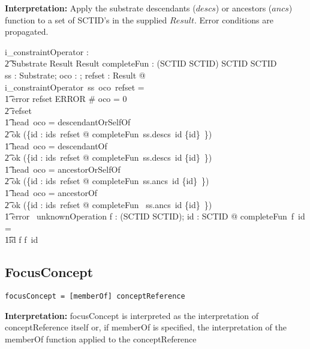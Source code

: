 \documentclass{article}
\begin{document}
\noindent
\textbf{Interpretation:}  Apply the substrate descendants ($descs$) or ancestors ($ancs$) function to a set of SCTID's in the supplied
$Result$.  Error conditions are propagated.


\begin{gendef}
   i\_constraintOperator : \\
\t2 Substrate \pfun \optional[constraintOperator] \pfun Result \pfun Result
\also
   completeFun : (SCTID \pfun \power SCTID) \fun SCTID \fun \power SCTID \\
\where
	\forall ss : Substrate; oco : \optional[constraintOperator]; refset : Result @ \\
i\_constraintOperator~ss~oco~refset = \\
\t1 \IF error \inv refset \in ERROR \lor \# oco = 0 \\
\t2 \THEN refset \\
\t1 \ELSE \IF head~oco = descendantOrSelfOf~ \\
\t2 \THEN ok (\bigcup \{id : ids~refset @ completeFun~ss.descs~id \cup \{id\}~\}) \\
\t1 \ELSE \IF head~oco = descendantOf~ \\
\t2 \THEN ok  (\bigcup \{id : ids~refset @ completeFun~ss.descs~id \setminus \{id\}~\}) \\
\t1 \ELSE \IF head~oco = ancestorOrSelfOf~ \\
\t2 \THEN  ok (\bigcup \{id : ids~refset @ completeFun~ss.ancs~id \cup \{id\}~\}) \\
\t1 \ELSE \IF head~oco = ancestorOf~ \\
\t2 \THEN ok (\bigcup \{id : ids~refset @ completeFun~ ss.ancs~id \setminus \{id\}~\}) \\
\t1 \ELSE error~ unknownOperation
\also
   \forall f : (SCTID \pfun \power SCTID); id : SCTID @ completeFun~f~id = \\
\t1\IF id \in \dom f \THEN f~id \ELSE \emptyset 
\end{gendef}


\subsection{FocusConcept}

\begin{verbatim}
focusConcept = [memberOf] conceptReference
\end{verbatim}

\textbf{Interpretation:}  focusConcept is interpreted as the interpretation of conceptReference itself or, if memberOf is specified, the interpretation of the memberOf function
applied to the conceptReference
\end{document}
